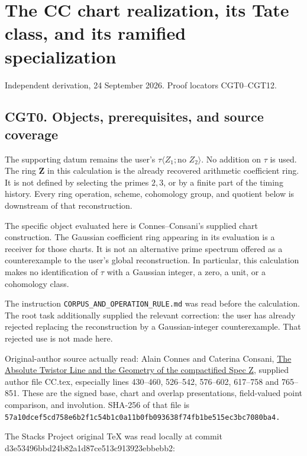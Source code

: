 \section{The CC chart realization, its Tate class, and its ramified
specialization}\label{the-cc-chart-realization-its-tate-class-and-its-ramified-specialization}

Independent derivation, 24 September 2026. Proof locators CGT0--CGT12.

\subsection{CGT0. Objects, prerequisites, and source
coverage}\label{cgt0.-objects-prerequisites-and-source-coverage}

The supporting datum remains the user's
\(\tau\langle Z_1;\text{no }Z_2\rangle\). No addition on \(\tau\) is
used. The ring \(\mathbf Z\) in this calculation is the already
recovered arithmetic coefficient ring. It is not defined by selecting
the primes \(2,3\), or by a finite part of the timing history. Every
ring operation, scheme, cohomology group, and quotient below is
downstream of that reconstruction.

The specific object evaluated here is Connes--Consani's supplied chart
construction. The Gaussian coefficient ring appearing in its evaluation
is a receiver for those charts. It is not an alternative prime spectrum
offered as a counterexample to the user's global reconstruction. In
particular, this calculation makes no identification of \(\tau\) with a
Gaussian integer, a zero, a unit, or a cohomology class.

The instruction
{\nolinkurl{CORPUS_AND_OPERATION_RULE.md}}
was read before the calculation. The root task additionally supplied the
relevant correction: the user has already rejected replacing the
reconstruction by a Gaussian-integer counterexample. That rejected use
is not made here.

Original-author source actually read: Alain Connes and Caterina Consani,
\href{https://arxiv.org/html/2609.00299v1}{The Absolute Twistor Line and
the Geometry of the compactified Spec Z}, supplied author file CC.tex,
especially lines 430--460, 526--542, 576--602, 617--758 and 765--851.
These are the signed base, chart and overlap presentations, field-valued
point comparison, and involution. SHA-256 of that file is
\nolinkurl{57a10dcef5cd758e6b2f1c54b1c0a11b0fb093638f74fb1be515ec3bc7080ba4.}

The Stacks Project original TeX was read locally at commit
d3e53496bbd24b82a1d87ce513c913923ebbebb2:

